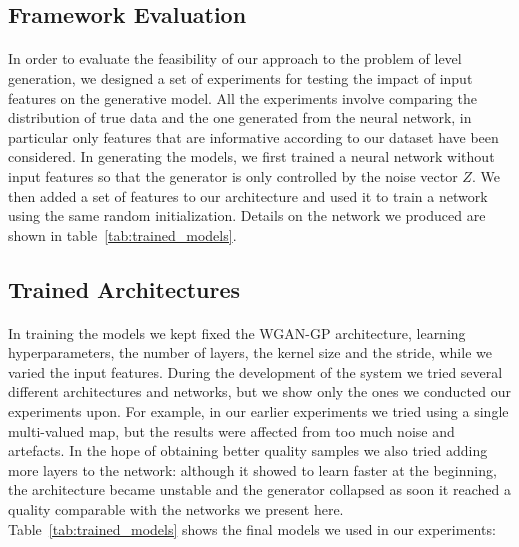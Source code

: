 \subsection{Framework Evaluation}
\label{sec:modelevaluation}
\paragraph{} In order to evaluate the feasibility of our approach to the problem of level generation, we designed a set of experiments for testing the impact of input features on the generative model. 
All the experiments involve comparing the distribution of true data and the one generated from the neural network, in particular only features that are informative according to our dataset have been considered. In generating the models, we first trained a neural network without input features so that the generator is only controlled by the noise vector $Z$. We then added a set of features to our architecture and used it to train a network using the same random initialization. Details on the network we produced are shown in table~\ref{tab:trained_models}.

\newpage
\subsection{Trained Architectures}
\label{sec:trainednets}
\paragraph{} In training the models we kept fixed the WGAN-GP architecture, learning hyperparameters, the number of layers, the kernel size and the stride, while we varied the input features. During the development of the system we tried several different architectures and networks, but we show only the ones we conducted our experiments upon. For example, in our earlier experiments we tried using a single multi-valued map, but the results were affected from too much noise and artefacts. In the hope of obtaining better quality samples we also tried adding more layers to the network: although it showed to learn faster at the beginning, the architecture became unstable and the generator collapsed as soon it reached a quality comparable with the networks we present here. Table~\ref{tab:trained_models} shows the final models we used in our experiments:

